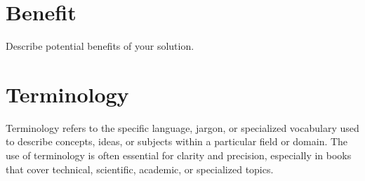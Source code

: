 \section{Benefit}
\label{section:benefit}

Describe potential benefits of your solution.

\section{Terminology}
\label{section:terminology}

Terminology refers to the specific language, jargon, or
specialized vocabulary used to describe concepts, ideas, or subjects within a
particular field or domain. The use of terminology is often essential for clarity
and precision, especially in books that cover technical, scientific, academic, or
specialized topics.